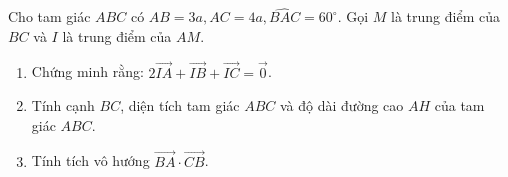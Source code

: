 \begin{bt}%
	Cho tam giác $ABC$ có $AB=3a,AC=4a,\widehat{BAC}=60^{\circ}$. Gọi $M$ là trung điểm của $BC$ và $I$ là trung điểm của $AM$.
	\begin{enumerate}
		\item Chứng minh rằng: $2\overrightarrow{IA}+\overrightarrow{IB}+\overrightarrow{IC}=\overrightarrow{0}$.
		\item Tính cạnh $BC$, diện tích tam giác $ABC$ và độ dài đường cao $AH$ của tam giác $ABC$.
		\item Tính tích vô hướng $\overrightarrow{BA}\cdot\overrightarrow{CB}$.
	\end{enumerate}
\end{bt}
